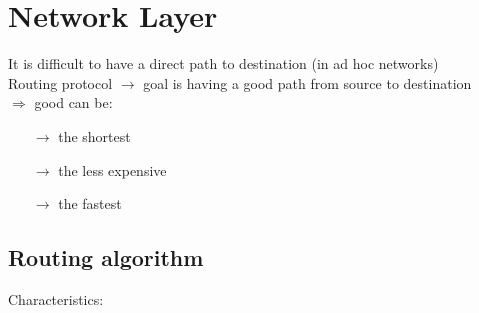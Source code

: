 \section{Network Layer}
It is difficult to have a direct path to destination (in ad hoc networks)\\
Routing protocol $\rightarrow$ goal is having a good path from source to destination\\
$\Rightarrow$ good can be:
\begin{itemize}
    \item[$\rightarrow$] the shortest
    \item[$\rightarrow$] the less expensive
    \item[$\rightarrow$] the fastest
\end{itemize}
\subsection{Routing algorithm}
Characteristics:
